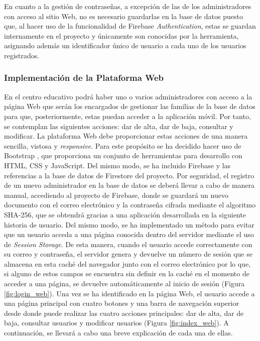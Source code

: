 En cuanto a la gestión de contraseñas, a excepción de las de los administradores con acceso al sitio Web, no es necesario guardarlas en la base de datos  puesto que, al hacer uso de la funcionalidad de Firebase \textit{Authentication}, estas se guardan internamente en el proyecto y únicamente son conocidas por la herramienta, asignando además un identificador único de usuario a cada uno de los usuarios registrados.

\subsubsection{Implementación de la Plataforma Web}
En el centro educativo podrá haber uno o varios administradores con acceso a la página Web que serán los encargados de gestionar las familias de la base de datos para que, posteriormente, estas puedan acceder a la aplicación móvil. Por tanto, se contemplan las siguientes acciones: dar de alta, dar de baja, consultar y modificar. La plataforma Web debe proporcionar estas acciones de una manera sencilla, vistosa y \textit{responsive}. Para este propósito se ha decidido hacer uso de Bootstrap \cite{Bootstrap}, que proporciona un conjunto de herramientas para desarrollo con HTML, CSS y JavaScript. Del mismo modo, se ha incluido Firebase y las referencias a la base de datos de Firestore del proyecto. Por seguridad, el registro de un nuevo administrador en la base de datos se deberá llevar a cabo de manera manual, accediendo al proyecto de Firebase, donde se guardará un nuevo documento con el correo electrónico y la contraseña cifrada mediante el algoritmo SHA-256, que se obtendrá gracias a una aplicación desarrollada en la siguiente historia de usuario. Del mismo modo, se ha implementado un método para evitar que un usuario acceda a una página conocida dentro del servidor mediante el uso de \textit{Session Storage}. De esta manera, cuando el usuario accede correctamente con su correo y contraseña, el servidor genera y devuelve un número de sesión que se almacena en esta caché del navegador junto con el correo electrónico por lo que, si alguno de estos campos se encuentra sin definir en la caché en el momento de acceder a una página, se devuelve automáticamente al inicio de sesión (Figura \ref{fig:login_web}). Una vez se ha identificado en la página Web, el usuario accede a una página principal con cuatro botones y una barra de navegación superior desde donde puede realizar las cuatro acciones principales: dar de alta, dar de baja, consultar usuarios y modificar usuarios (Figura \ref{fig:index_web}). A continuación, se llevará a cabo una breve explicación de cada una de ellas.

